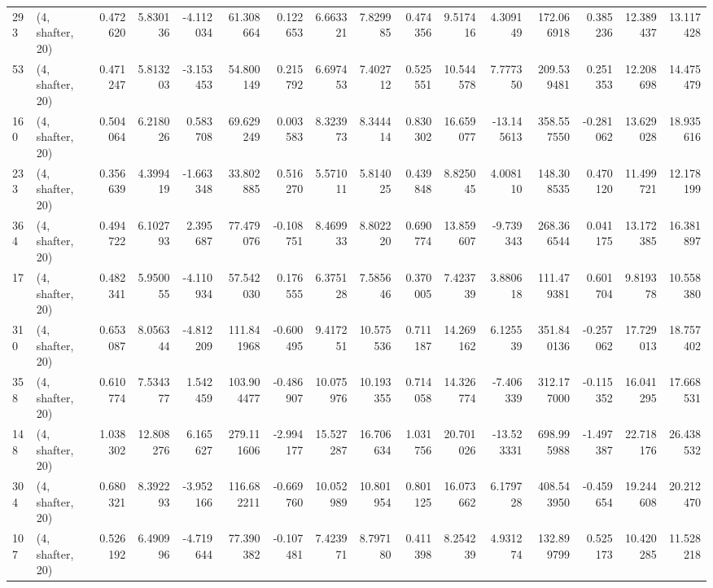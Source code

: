 \begin{tabular}{llrrrrrrrrrrrrrr}
293 &  (4, shafter, 20) &   0.472620 &   5.830136 &  -4.112034 &    61.308664 &   0.122653 &   6.663321 &   7.829985 &  0.474356 &   9.517416 &   4.309149 &   172.066918 &   0.385236 &  12.389437 &  13.117428 \\
53  &  (4, shafter, 20) &   0.471247 &   5.813203 &  -3.153453 &    54.800149 &   0.215792 &   6.697453 &   7.402712 &  0.525551 &  10.544578 &   7.777350 &   209.539481 &   0.251353 &  12.208698 &  14.475479 \\
160 &  (4, shafter, 20) &   0.504064 &   6.218026 &   0.583708 &    69.629249 &   0.003583 &   8.323973 &   8.344414 &  0.830302 &  16.659077 & -13.145613 &   358.557550 &  -0.281062 &  13.629028 &  18.935616 \\
233 &  (4, shafter, 20) &   0.356639 &   4.399419 &  -1.663348 &    33.802885 &   0.516270 &   5.571011 &   5.814025 &  0.439848 &   8.825045 &   4.008110 &   148.308535 &   0.470120 &  11.499721 &  12.178199 \\
364 &  (4, shafter, 20) &   0.494722 &   6.102793 &   2.395687 &    77.479076 &  -0.108751 &   8.469933 &   8.802220 &  0.690774 &  13.859607 &  -9.739343 &   268.366544 &   0.041175 &  13.172385 &  16.381897 \\
17  &  (4, shafter, 20) &   0.482341 &   5.950055 &  -4.110934 &    57.542030 &   0.176555 &   6.375128 &   7.585646 &  0.370005 &   7.423739 &   3.880618 &   111.479381 &   0.601704 &   9.819378 &  10.558380 \\
310 &  (4, shafter, 20) &   0.653087 &   8.056344 &  -4.812209 &   111.841968 &  -0.600495 &   9.417251 &  10.575536 &  0.711187 &  14.269162 &   6.125539 &   351.840136 &  -0.257062 &  17.729013 &  18.757402 \\
358 &  (4, shafter, 20) &   0.610774 &   7.534377 &   1.542459 &   103.904477 &  -0.486907 &  10.075976 &  10.193355 &  0.714058 &  14.326774 &  -7.406339 &   312.177000 &  -0.115352 &  16.041295 &  17.668531 \\
148 &  (4, shafter, 20) &   1.038302 &  12.808276 &   6.165627 &   279.111606 &  -2.994177 &  15.527287 &  16.706634 &  1.031756 &  20.701026 & -13.523331 &   698.995988 &  -1.497387 &  22.718176 &  26.438532 \\
304 &  (4, shafter, 20) &   0.680321 &   8.392293 &  -3.952166 &   116.682211 &  -0.669760 &  10.052989 &  10.801954 &  0.801125 &  16.073662 &   6.179728 &   408.543950 &  -0.459654 &  19.244608 &  20.212470 \\
107 &  (4, shafter, 20) &   0.526192 &   6.490996 &  -4.719644 &    77.390382 &  -0.107481 &   7.423971 &   8.797180 &  0.411398 &   8.254239 &   4.931274 &   132.899799 &   0.525173 &  10.420285 &  11.528218 \\

\end{tabular}
